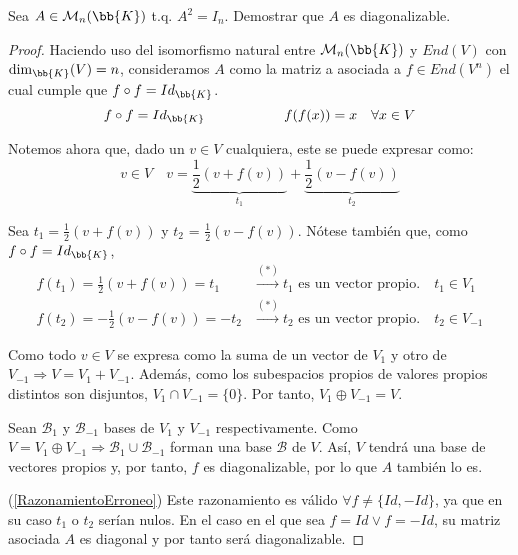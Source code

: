 \begin{ejercicio}
    Sea $A \in \mathcal{M}_n(\bb{K})$ t.q. $A^2=I_n$. Demostrar que $A$ es diagonalizable.
    \begin{proof}
        Haciendo uso del isomorfismo natural entre $\mathcal{M}_n(\bb{K})$ y $End(V)$ con $\dim_\bb{K}(V)=n$, consideramos $A$ como la matriz a asociada a $f\in End(V^n)$ el cual cumple que $f\circ f = Id_\bb{K}$.
        $$f\circ f = Id_\bb{K} \hspace{2cm} f(f(x))=x\quad \forall x\in V$$

        Notemos ahora que, dado un $v\in V$ cualquiera, este se puede expresar como:
        $$v\in V\quad v = \underbrace{\frac{1}{2}(v+f(v))}_{t_1} + \underbrace{\frac{1}{2}(v-f(v))}_{t_2}$$
        
        Sea $t_1 = \frac{1}{2}(v+f(v))$ y $t_2$ = $\frac{1}{2}(v-f(v))$. Nótese también que, como $f\circ f = Id_\bb{K}$,
        \begin{equation}\label{RazonamientoErroneo}\tag{$\ast$}
        \begin{split}
            f(t_1) = \frac{1}{2}(v+f(v)) = t_1& \xrightarrow{(\ast)} t_1 \text{ es un vector propio.}\quad t_1\in V_1 \\
            f(t_2) = -\frac{1}{2}(v-f(v)) = -t_2& \xrightarrow{(\ast)} t_2 \text{ es un vector propio.}\quad t_2\in V_{-1}
        \end{split}\end{equation}


        Como todo $v \in V$ se expresa como la suma de un vector de $V_1$ y otro de $V_{-1} \Longrightarrow V=V_1 + V_{-1}$. Además, como los subespacios propios de valores propios distintos son disjuntos, $V_1 \cap V_{-1} = \{0\}$. Por tanto, $V_1 \oplus V_{-1} = V$.

        Sean $\mathcal{B}_1$ y $\mathcal{B}_{-1}$ bases de $V_1$ y $V_{-1}$ respectivamente. Como $V=V_1\oplus V_{-1} \Longrightarrow \mathcal{B}_{1} \cup \mathcal{B}_{-1}$ forman una base $\mathcal{B}$ de $V$. Así, $V$ tendrá una base de vectores propios y, por tanto, $f$ es diagonalizable, por lo que $A$ también lo es.

        (\ref{RazonamientoErroneo}) Este razonamiento es válido $\forall f \neq \{Id, -Id\}$, ya que en su caso $t_1$ o $t_2$ serían nulos. En el caso en el que sea $f=Id \lor f=-Id$, su matriz asociada $A$ es diagonal y por tanto será diagonalizable.
        
    \end{proof}
\end{ejercicio}

